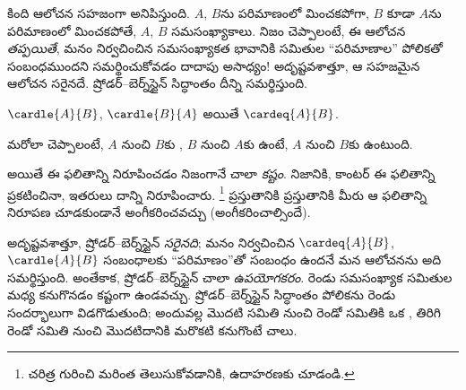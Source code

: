 \documentclass[../../../include/open-logic-section]{subfiles}
\begin{document}


\begin{explain}
కింది ఆలోచన సహజంగా అనిపిస్తుంది. $A$, $B$ను పరిమాణంలో మించకపోగా,
$B$ కూడా $A$ను పరిమాణంలో మించకపోతే, $A$, $B$ సమసంఖ్యాకాలు.
నిజం చెప్పాలంటే, ఈ ఆలోచన \emph{తప్పయితే}, మనం నిర్వచించిన
సమసంఖ్యాకత భావానికి సమితుల ``పరిమాణాల'' పోలికతో సంబంధముందని
సమర్థించుకోవడం దాదాపు అసాధ్యం!{} అదృష్టవశాత్తూ, ఆ సహజమైన ఆలోచన
సరైనదే. ష్రోడర్--బెర్న్‌స్టైన్ సిద్ధాంతం దీన్ని సమర్థిస్తుంది.
\end{explain}

\begin{thm}[ష్రోడర్--బెర్న్‌స్టైన్]
	$\cardle{A}{B}$, $\cardle{B}{A}$ అయితే
	$\cardeq{A}{B}$.
\end{thm}

\begin{explain}
మరోలా చెప్పాలంటే, $A$ నుంచి $B$కు , $B$ నుంచి $A$కు
 ఉంటే, $A$ నుంచి $B$కు  ఉంటుంది.

అయితే ఈ ఫలితాన్ని నిరూపించడం నిజంగానే చాలా \emph{కష్టం}. నిజానికి,
కాంటర్ ఈ ఫలితాన్ని ప్రకటించినా, ఇతరులు దాన్ని నిరూపించారు.
\footnote{చరిత్ర గురించి మరింత తెలుసుకోవడానికి, ఉదాహరణకు
\citet[pp.~165--6]{Potter2004} చూడండి.}
%
ప్రస్తుతానికి ప్రస్తుతానికి మీరు ఆ ఫలితాన్ని నిరూపణ చూడకుండానే అంగీకరించవచ్చు (అంగీకరించాల్సిందే).

అదృష్టవశాత్తూ, ష్రోడర్--బెర్న్‌స్టైన్ \emph{సరైనది}; మనం నిర్వచించిన
$\cardeq{A}{B}$, $\cardle{A}{B}$ సంబంధాలకు ``పరిమాణం''తో సంబంధం
ఉందనే మన ఆలోచనను అది సమర్థిస్తుంది. అంతేకాక,
ష్రోడర్--బెర్న్‌స్టైన్ చాలా \emph{ఉపయోగకరం}. రెండు సమసంఖ్యాక
సమితుల మధ్య  కనుగొనడం కష్టంగా ఉండవచ్చు.
ష్రోడర్--బెర్న్‌స్టైన్ సిద్ధాంతం పోలికను రెండు సందర్భాలుగా విడగొడుతుంది;
అందువల్ల మొదటి సమితి నుంచి రెండో సమితికి ఒక , తిరిగి
రెండో సమితి నుంచి మొదటిదానికి మరొకటి కనుగొంటే చాలు.
\end{explain}
\end{document}
